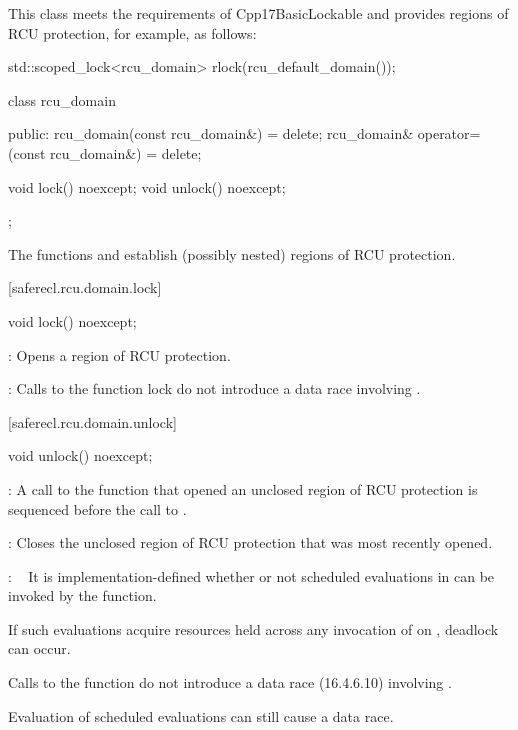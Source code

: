 This class meets the requirements of Cpp17BasicLockable  and provides regions of RCU protection, for example, as follows:

\begin{codeblock}
std::scoped_lock<rcu_domain> rlock(rcu_default_domain());
\end{codeblock}

\begin{codeblock}
class rcu_domain {
public:
  rcu_domain(const rcu_domain&) = delete;
  rcu_domain& operator=(const rcu_domain&) = delete;

  void lock() noexcept;
  void unlock() noexcept;
};
\end{codeblock}

The functions  and  establish (possibly nested)
regions of RCU protection.

[saferecl.rcu.domain.lock]{}

\begin{itemdecl}
void lock() noexcept;
\end{itemdecl}

\begin{itemdescr}

\pnum
{}: Opens a region of RCU protection.

\pnum
{}: Calls to the function lock do not introduce a data race
 involving .

\end{itemdescr}

[saferecl.rcu.domain.unlock]{}

\begin{itemdecl}
void unlock() noexcept;
\end{itemdecl}

\begin{itemdescr}

\pnum
{}: A call to the function  that opened
an unclosed region of RCU protection is sequenced before the
call to .

\pnum
{}: Closes the unclosed region of RCU protection that was
most recently opened.

\pnum
{}:   It is implementation-defined whether or not scheduled
evaluations in  can be invoked by the 
function.
\begin{note}
If such evaluations acquire resources held across any invocation
of  on , deadlock can occur.
\end{note}
Calls to the function  do not introduce a data race
(16.4.6.10) involving .
\begin{note}
Evaluation of scheduled evaluations can still cause a data race.
\end{note}

\end{itemdescr}


